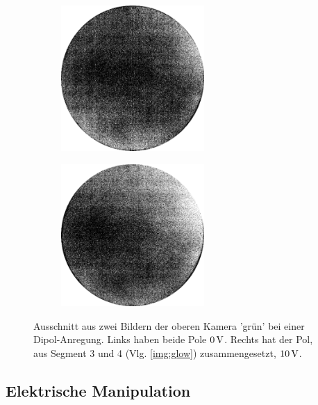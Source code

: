 \documentclass[numbers=noenddot,a4paper]{scrartcl}
\begin{document}
						\begin{figure}[!h]
							\centering
							\begin{subfigure}{0.49\textwidth}
								\centering
								\includegraphics[width=0.6\textwidth,height=0.6\textwidth]{figs/auswertung/beispieldipolglownu.pdf}
							\end{subfigure}
							\begin{subfigure}{0.49\textwidth}
								\centering
								\includegraphics[width=0.6\textwidth,height=0.6\textwidth]{figs/auswertung/beispieldipolglow.pdf}
							\end{subfigure}
							\caption{Ausschnitt aus zwei Bildern der oberen Kamera 'grün' bei einer Dipol-Anregung. Links haben beide Pole $\unit[0]{V}$. Rechts hat der Pol, aus Segment 3 und 4 (Vlg. \ref{img:glow}) zusammengesetzt, $\unit[10]{V}$.}
						\end{figure}

			\newpage

        \subsection{Elektrische Manipulation}
\end{document}
